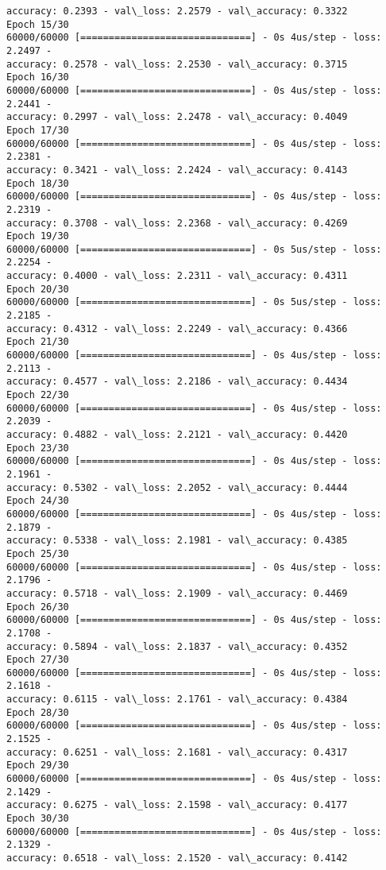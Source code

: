 \documentclass[11pt]{article}
\begin{document}
\begin{Verbatim}[commandchars=\\\{\}]
accuracy: 0.2393 - val\_loss: 2.2579 - val\_accuracy: 0.3322
Epoch 15/30
60000/60000 [==============================] - 0s 4us/step - loss: 2.2497 -
accuracy: 0.2578 - val\_loss: 2.2530 - val\_accuracy: 0.3715
Epoch 16/30
60000/60000 [==============================] - 0s 4us/step - loss: 2.2441 -
accuracy: 0.2997 - val\_loss: 2.2478 - val\_accuracy: 0.4049
Epoch 17/30
60000/60000 [==============================] - 0s 4us/step - loss: 2.2381 -
accuracy: 0.3421 - val\_loss: 2.2424 - val\_accuracy: 0.4143
Epoch 18/30
60000/60000 [==============================] - 0s 4us/step - loss: 2.2319 -
accuracy: 0.3708 - val\_loss: 2.2368 - val\_accuracy: 0.4269
Epoch 19/30
60000/60000 [==============================] - 0s 5us/step - loss: 2.2254 -
accuracy: 0.4000 - val\_loss: 2.2311 - val\_accuracy: 0.4311
Epoch 20/30
60000/60000 [==============================] - 0s 5us/step - loss: 2.2185 -
accuracy: 0.4312 - val\_loss: 2.2249 - val\_accuracy: 0.4366
Epoch 21/30
60000/60000 [==============================] - 0s 4us/step - loss: 2.2113 -
accuracy: 0.4577 - val\_loss: 2.2186 - val\_accuracy: 0.4434
Epoch 22/30
60000/60000 [==============================] - 0s 4us/step - loss: 2.2039 -
accuracy: 0.4882 - val\_loss: 2.2121 - val\_accuracy: 0.4420
Epoch 23/30
60000/60000 [==============================] - 0s 4us/step - loss: 2.1961 -
accuracy: 0.5302 - val\_loss: 2.2052 - val\_accuracy: 0.4444
Epoch 24/30
60000/60000 [==============================] - 0s 4us/step - loss: 2.1879 -
accuracy: 0.5338 - val\_loss: 2.1981 - val\_accuracy: 0.4385
Epoch 25/30
60000/60000 [==============================] - 0s 4us/step - loss: 2.1796 -
accuracy: 0.5718 - val\_loss: 2.1909 - val\_accuracy: 0.4469
Epoch 26/30
60000/60000 [==============================] - 0s 4us/step - loss: 2.1708 -
accuracy: 0.5894 - val\_loss: 2.1837 - val\_accuracy: 0.4352
Epoch 27/30
60000/60000 [==============================] - 0s 4us/step - loss: 2.1618 -
accuracy: 0.6115 - val\_loss: 2.1761 - val\_accuracy: 0.4384
Epoch 28/30
60000/60000 [==============================] - 0s 4us/step - loss: 2.1525 -
accuracy: 0.6251 - val\_loss: 2.1681 - val\_accuracy: 0.4317
Epoch 29/30
60000/60000 [==============================] - 0s 4us/step - loss: 2.1429 -
accuracy: 0.6275 - val\_loss: 2.1598 - val\_accuracy: 0.4177
Epoch 30/30
60000/60000 [==============================] - 0s 4us/step - loss: 2.1329 -
accuracy: 0.6518 - val\_loss: 2.1520 - val\_accuracy: 0.4142
    \end{Verbatim}
\end{document}
